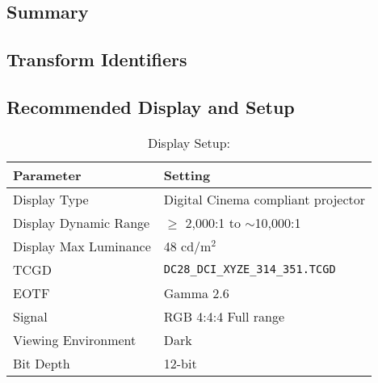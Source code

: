 \section[DCDM P3 Clip]{\shortName{}}
\label{sec:odt-details-\id}

\subsection{Summary}
\label{subsec:summary-\id}

\lipsum[1-2] %

\subsection{Transform Identifiers} 
\label{subsec:odt-ident-\id}

\subsection{Recommended Display and Setup}
\label{subsec:setup-\id}

\begin{table}[ht!]
    \centering
        \begin{tabular}{|p{1.5in}|p{3in}|}
            \hline
            \textbf{Parameter} 		& 	\textbf{Setting} 				 		\\ \hline
            Display Type 			&	Digital Cinema compliant projector 		\\ \hline
            Display Dynamic Range 	& 	$\geq$ 2,000:1 to $\sim$10,000:1 		\\ \hline
            Display Max Luminance 	& 	48 cd/m$^2$								\\ \hline
            TCGD	 				& 	\texttt{DC28\_DCI\_XYZE\_314\_351.TCGD}	\\ \hline
            EOTF					& 	Gamma 2.6 								\\ \hline
            Signal 					&	RGB 4:4:4 Full range					\\ \hline
            Viewing Environment 	& 	Dark 									\\ \hline
            Bit Depth 				& 	12-bit 									\\ \hline 
    \end{tabular}
    \caption{Display Setup: \shortName{}} 
    \label{tab:setup-\id}
\end{table}

